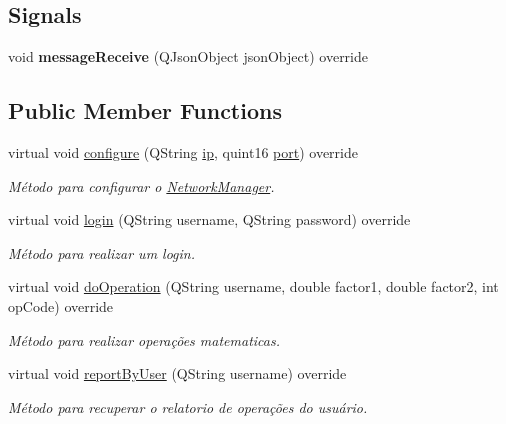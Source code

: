 \subsection*{Signals}
\begin{DoxyCompactItemize}
\item 
void {\bfseries message\+Receive} (Q\+Json\+Object json\+Object) override\hypertarget{classNetworkManagerImpl_ae375fb6f5addc6325cb3a037bd9eca39}{}\label{classNetworkManagerImpl_ae375fb6f5addc6325cb3a037bd9eca39}

\end{DoxyCompactItemize}
\subsection*{Public Member Functions}
\begin{DoxyCompactItemize}
\item 
virtual void \hyperlink{classNetworkManagerImpl_a4ad2bada544bc02ea1f9921f3f6f62c2}{configure} (Q\+String \hyperlink{classNetworkManagerImpl_ac5d5c68c8000d8afef7632259e19f788}{ip}, quint16 \hyperlink{classNetworkManagerImpl_a4723f928e10d6d90987ff673b36c434d}{port}) override
\begin{DoxyCompactList}\small\item\em Método para configurar o \hyperlink{classNetworkManager}{Network\+Manager}. \end{DoxyCompactList}\item 
virtual void \hyperlink{classNetworkManagerImpl_aa468744d773aacf43763fde8e8bd95df}{login} (Q\+String username, Q\+String password) override
\begin{DoxyCompactList}\small\item\em Método para realizar um login. \end{DoxyCompactList}\item 
virtual void \hyperlink{classNetworkManagerImpl_a18fcb6129bcaa5f7f225d92ac5d6cd1c}{do\+Operation} (Q\+String username, double factor1, double factor2, int op\+Code) override
\begin{DoxyCompactList}\small\item\em Método para realizar operações matematicas. \end{DoxyCompactList}\item 
virtual void \hyperlink{classNetworkManagerImpl_aba85b7a85efee5cc28995c0df82bef5a}{report\+By\+User} (Q\+String username) override
\begin{DoxyCompactList}\small\item\em Método para recuperar o relatorio de operações do usuário. \end{DoxyCompactList}\item 

\end{DoxyCompactItemize}
